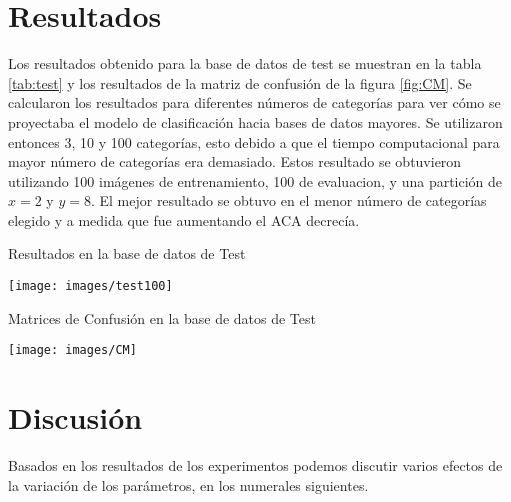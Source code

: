 \documentclass[10pt,twocolumn,letterpaper]{article}
\begin{document}
\section{Resultados}
Los resultados obtenido para la base de datos de test se muestran en la tabla \ref{tab:test}  y los resultados de la matriz de confusión de la figura \ref{fig:CM}. Se calcularon los resultados para diferentes números de categorías para ver cómo se proyectaba el modelo de clasificación hacia bases de datos mayores. Se utilizaron entonces 3, 10 y 100 categorías, esto debido a que el tiempo computacional para mayor número de categorías era demasiado.  Estos resultado se obtuvieron utilizando 100 imágenes de entrenamiento, 100 de evaluacion, y una partición de $x=2$ y $y=8$. El mejor resultado se obtuvo en el menor número de categorías elegido y a medida que fue aumentando el ACA decrecía. 
\begin{table}[h]
\caption{Resultados en la base de datos de Test}
\texttt{[image: images/test100]}
\label{tab:test}
\end{table}
\begin{table}[h]
\caption{Matrices de Confusión en la base de datos de Test}
\texttt{[image: images/CM]}
\label{fig:CM}
\end{table}

\section{Discusión}

Basados en los resultados de los experimentos podemos discutir varios efectos de la variación de los parámetros, en los numerales siguientes. 

\end{document}
